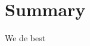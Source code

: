 \documentclass[../photoevap.tex]{subfiles}
\begin{document}
\section{Summary}
\label{sec:summary}

We de best
\end{document}
